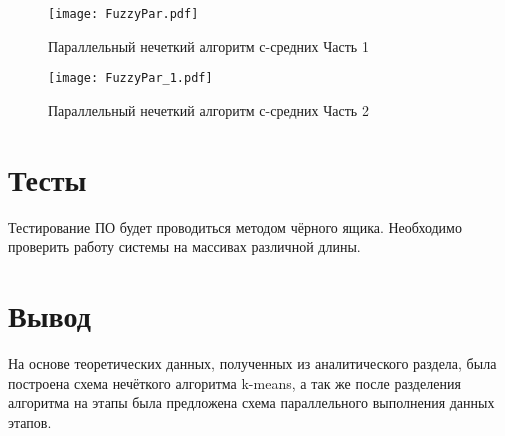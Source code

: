        	\begin{figure}[h!]
            \centering
            \texttt{[image: FuzzyPar.pdf]}
            \caption{Параллельный нечеткий алгоритм с-средних Часть 1}
            \label{schema:FuzzyPar}
        \end{figure}\clearpage
        \begin{figure}[h!]
            \centering
            \texttt{[image: FuzzyPar\_1.pdf]}
            \caption{Параллельный нечеткий алгоритм с-средних Часть 2}
            \label{schema:FuzzyPar_1}
        \end{figure}\clearpage
    \section{Тесты}
    Тестирование ПО будет проводиться методом чёрного ящика. Необходимо проверить работу системы 
    на массивах различной длины.
  	

	\section*{Вывод}
    \par На основе теоретических данных, полученных из аналитического раздела, была построена схема нечёткого алгоритма k-means, а так же после разделения алгоритма на этапы была предложена схема параллельного выполнения данных этапов.
\newpage